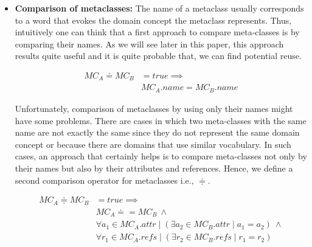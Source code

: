 \begin{itemize}
\item \textbf{Comparison of metaclasses:} The name of a metaclass usually corresponds to a word that evokes the domain concept the metaclass represents. Thus, intuitively one can think that a first approach to compare meta-classes is by comparing their names. As we will see later in this paper, this approach results quite useful and it is quite probable that, we can find potential reuse.

\begin{equation}
\begin{split}
  MC_{A} \doteq MC_{B} &= true \implies \\
   & MC_{A}.name = MC_{B}.name
 \end{split}
\end{equation}

\vspace{1mm}
\hspace{3mm} Unfortunately, comparison of metaclasses by using only their names might have some problems. There are cases in which two meta-classes with the same name are not exactly the same since they do not represent the same domain concept or because there are domains that use similar vocabulary. In such cases, an approach that certainly helps is to compare meta-classes not only by their names but also by their attributes and references. Hence, we define a second comparison operator for metaclasses i.e., $\doteqdot $.

\begin{equation}
\begin{split}
  MC_{A} \doteqdot MC_{B} &= true \implies \\
   & MC_{A} \doteq = MC_{B} ~ \wedge \\
   & \forall a_1 \in MC_{A}.attr \mid (\exists a_2 \in MC_{B}.attr \mid a_1 = a_2) ~ \wedge \\
   & \forall r_1 \in MC_{A}.refs \mid (\exists r_2 \in MC_{B}.refs \mid r_1 = r_2)
  \end{split}
\end{equation}


\end{itemize}
